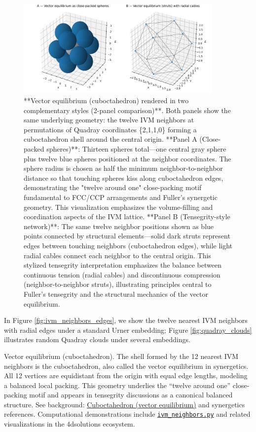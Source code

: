 \documentclass[
  10pt,
]{article}
\begin{document}
\begin{figure}[htbp]
\centering
\includegraphics[width=0.9\textwidth]{figures/vector_equilibrium_panels.png}
\caption{**Vector equilibrium (cuboctahedron) rendered in two complementary styles (2-panel comparison)**. Both panels show the same underlying geometry: the twelve IVM neighbors at permutations of Quadray coordinates \{2,1,1,0\} forming a cuboctahedron shell around the central origin. **Panel A (Close-packed spheres)**: Thirteen spheres total—one central gray sphere plus twelve blue spheres positioned at the neighbor coordinates. The sphere radius is chosen as half the minimum neighbor-to-neighbor distance so that touching spheres kiss along cuboctahedron edges, demonstrating the "twelve around one" close-packing motif fundamental to FCC/CCP arrangements and Fuller's synergetic geometry. This visualization emphasizes the volume-filling and coordination aspects of the IVM lattice. **Panel B (Tensegrity-style network)**: The same twelve neighbor positions shown as blue points connected by structural elements—solid dark struts represent edges between touching neighbors (cuboctahedron edges), while light radial cables connect each neighbor to the central origin. This stylized tensegrity interpretation emphasizes the balance between continuous tension (radial cables) and discontinuous compression (neighbor-to-neighbor struts), illustrating principles central to Fuller's tensegrity and the structural mechanics of the vector equilibrium.}
\label{fig:vector_equilibrium}
\end{figure}

In Figure \ref{fig:ivm_neighbors_edges}, we show the twelve nearest IVM
neighbors with radial edges under a standard Urner embedding; Figure
\ref{fig:quadray_clouds} illustrates random Quadray clouds under several
embeddings.

Vector equilibrium (cuboctahedron). The shell formed by the 12 nearest
IVM neighbors is the cuboctahedron, also called the vector equilibrium
in synergetics. All 12 vertices are equidistant from the origin with
equal edge lengths, modeling a balanced local packing. This geometry
underlies the ``twelve around one'' close-packing motif and appears in
tensegrity discussions as a canonical balanced structure. See
background:
\href{https://en.wikipedia.org/wiki/Cuboctahedron}{Cuboctahedron (vector
equilibrium)} and synergetics references. Computational demonstrations
include
\href{https://github.com/4dsolutions/School_of_Tomorrow/blob/master/quadcraft.py}{\texttt{ivm\_neighbors.py}}
and related visualizations in the 4dsolutions ecosystem.
\end{document}

